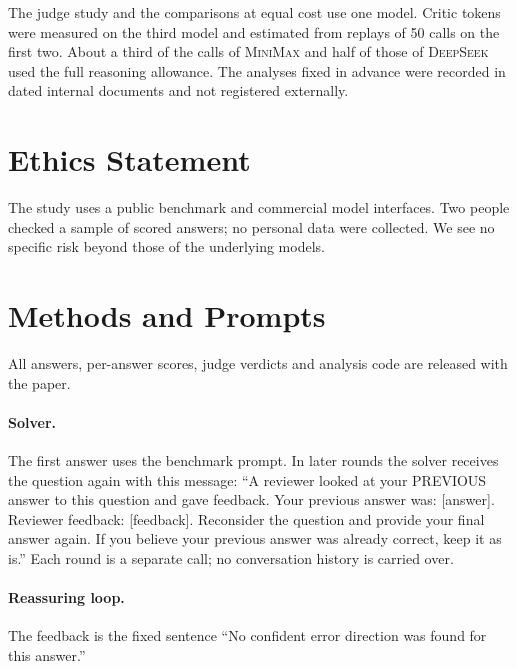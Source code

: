 \documentclass[11pt]{article}
\newcommand{\ds}{\textsc{DeepSeek}}
\newcommand{\mm}{\textsc{MiniMax}}
\begin{document}
The judge study and the comparisons at equal cost use one model.
Critic tokens were measured on the third model and estimated from replays of 50 calls on the first two.
About a third of the calls of \mm{} and half of those of \ds{} used the full reasoning allowance.
The analyses fixed in advance were recorded in dated internal documents and not registered externally.

\section*{Ethics Statement}

The study uses a public benchmark and commercial model interfaces.
Two people checked a sample of scored answers; no personal data were collected.
We see no specific risk beyond those of the underlying models.



\appendix

\section{Methods and Prompts}
\label{app:prompts}

All answers, per-answer scores, judge verdicts and analysis code are released with the paper.

\paragraph{Solver.}
The first answer uses the benchmark prompt.
In later rounds the solver receives the question again with this message: ``A reviewer looked at your PREVIOUS answer to this question and gave feedback. Your previous answer was: [answer]. Reviewer feedback: [feedback]. Reconsider the question and provide your final answer again. If you believe your previous answer was already correct, keep it as is.''
Each round is a separate call; no conversation history is carried over.

\paragraph{Reassuring loop.}
The feedback is the fixed sentence ``No confident error direction was found for this answer.''
\end{document}
